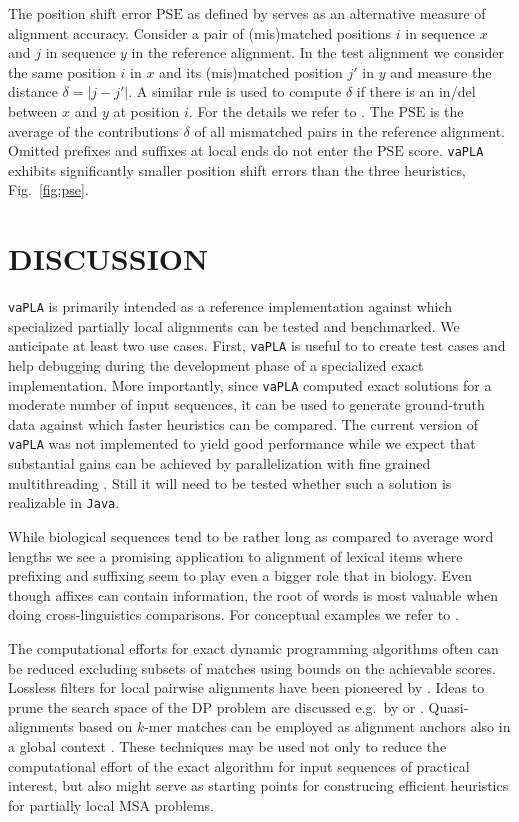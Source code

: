 \documentclass[a4paper,10pt]{article}
\let\cite\citep
\newcommand{\TODO}[1]{\begingroup\color{red}#1\endgroup}
\newcommand{\SAFTWARE}{\texttt{vaPLA}} %
\begin{document}
The position shift error $\mbox{PSE}$ as defined by \citet{oxbench} serves
as an alternative measure of alignment accuracy. Consider a pair of
(mis)matched positions $i$ in sequence $x$ and $j$ in sequence $y$ in the
reference alignment. In the test alignment we consider the same position
$i$ in $x$ and its (mis)matched position $j'$ in $y$ and measure the
distance $\delta=|j-j'|$. A similar rule is used to compute $\delta$ if
there is an in/del between $x$ and $y$ at position $i$. For the details we
refer to \cite{oxbench}. The $\mbox{PSE}$ is the average of the
contributions $\delta$ of all mismatched pairs in the reference alignment.
Omitted prefixes and suffixes at local ends do not enter the $\mbox{PSE}$
score. \SAFTWARE{} exhibits significantly smaller position shift errors
than the three heuristics, Fig.~\ref{fig:pse}.

\section{\uppercase{Discussion}}

\SAFTWARE{} is primarily intended as a reference implementation against
which specialized partially local alignments can be tested and
benchmarked. We anticipate at least two use cases. First, \SAFTWARE{} is
useful to to create test cases and help debugging during the development
phase of a specialized exact implementation. More importantly, since
\SAFTWARE{} computed exact solutions for a moderate number of input
sequences, it can be used to generate ground-truth data against which
faster heuristics can be compared. The current version of \SAFTWARE{} was
not implemented to yield good performance while we expect that substantial
gains can be achieved by parallelization with fine grained multithreading
\cite{Martins:01}. Still it will need to be tested whether such a solution
is realizable in \texttt{Java}.

While biological sequences tend to be rather long as compared to average
word lengths we see a promising application to alignment of lexical items
where prefixing and suffixing seem to play even a bigger role that in
biology. Even though affixes can contain information, the root of words is
most valuable when doing cross-linguistics comparisons. For conceptual
examples we refer to \cite{Retzlaff:18a}.

The computational efforts for exact dynamic programming algorithms
  often can be reduced excluding subsets of matches using bounds on the
  achievable scores. Lossless filters for local pairwise alignments have
  been pioneered by \citet{Peterlongo:08,Peterlongo:09}. Ideas to prune the
  search space of the DP problem are discussed e.g.\ by
  \citet{Schroedl:05} or \citet{Bilu:06}.  Quasi-alignments based on $k$-mer matches
  can be employed as alignment anchors also in a global context
  \cite{Nagar:13}. These techniques may be used not only to reduce the
  computational effort of the exact algorithm for input sequences of
  practical interest, but also might serve as starting points for
  construcing efficient heuristics for partially local MSA problems.
\end{document}
